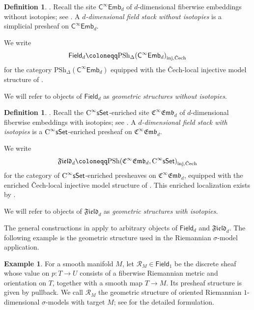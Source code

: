 \documentclass{amsart}
\newcommand{\cat}[1]{\mathsf{#1}}
\newcommand{\sset}{\cat{sSet}}
\newcommand{\inj}{\textnormal{inj}}
\newcommand{\Cech}{\textnormal{\v{C}ech}}
\newcommand{\CsSet}{\textnormal{C}^{\infty}\sset}
\newcommand{\field}[1]{\mathfrak{Field}_{#1}}
\newcommand{\fieldnoniso}[1]{\cat{Field}_{#1}}
\newcommand{\fembnoniso}[1]{\cat{C}^{\infty}\cat{Emb}_{#1}}
\newcommand{\femb}[1]{\mathfrak{C}^{\infty}\mathfrak{Emb}_{#1}}
\newcommand{\sheaf}[1]{\mathcal{#1}}
\newcommand{\psh}{\mathrm{PSh}}
\newcommand{\spsh}{\mathrm{PSh}_{\Delta}}
\newcommand{\RM}{\sheaf{R}_{M}}
\theoremstyle{definition}
\newtheorem{example}[equation]{Example}
\newtheorem{definition}[equation]{Definition}
\numberwithin{equation}{subsection}
\numberwithin{subsubsection}{subsection}
\begin{document}
\begin{definition}\label{def:geometric.structures.non.isotopies}
  \textnormal{\cite[Definition~5.1.1]{GP26}.}
  Recall the site \( \fembnoniso{d} \) of \(d\)-dimensional fiberwise
  embeddings without isotopies; see . A
  \emph{\(d\)-dimensional field stack without isotopies} is a simplicial
  presheaf on \( \fembnoniso{d} \).

  We write
  \[
    \fieldnoniso{d}
    \coloneqq
    \spsh(\fembnoniso{d})_{\inj,\Cech}
  \]
  for the category \(\spsh(\fembnoniso{d})\) equipped with the
  \v{C}ech-local injective model structure of
  .

  We will refer to objects of \( \fieldnoniso{d} \) as
  \emph{geometric structures without isotopies}.
\end{definition}

\begin{definition}\label{def:geometric.structures}
  \textnormal{\cite[Definition~5.1.3]{GP26}.}
  Recall the \( \CsSet \)-enriched site \( \femb{d} \) of
  \(d\)-dimensional fiberwise embeddings with isotopies; see
  . A \emph{\(d\)-dimensional field stack with isotopies}
  is a \( \CsSet \)-enriched presheaf on \( \femb{d} \).

  We write
  \[
    \field{d}
    \coloneqq
    \psh(\femb{d},\CsSet)_{\inj,\Cech}
  \]
  for the category of \(\CsSet\)-enriched presheaves on
  \(\femb{d}\), equipped with the enriched \v{C}ech-local injective model
  structure
  of . This enriched
  localization exists by
  .

  We will refer to objects of \( \field{d} \) as
  \emph{geometric structures with isotopies}.
\end{definition}

The general constructions in  apply to arbitrary
objects of \(\fieldnoniso{d}\)
and \(\field{d}\). The following example is the geometric structure used in the
Riemannian \(\sigma\)-model application.

\begin{example}\label{ex:riemannian.structure}
  For a smooth manifold \(M\), let \(\RM\in\fieldnoniso{1}\) be the
  discrete sheaf whose value on \(p:T\to U\) consists of a fiberwise
  Riemannian metric and orientation on \(T\), together with a smooth map
  \(T\to M\). Its presheaf structure is given by pullback. We call \(\RM\)
  the geometric structure of oriented Riemannian \(1\)-dimensional
  \(\sigma\)-models with target \(M\); see
  \cite[Definition~3.1.1]{KP26} for the detailed formulation.
\end{example}
\end{document}
